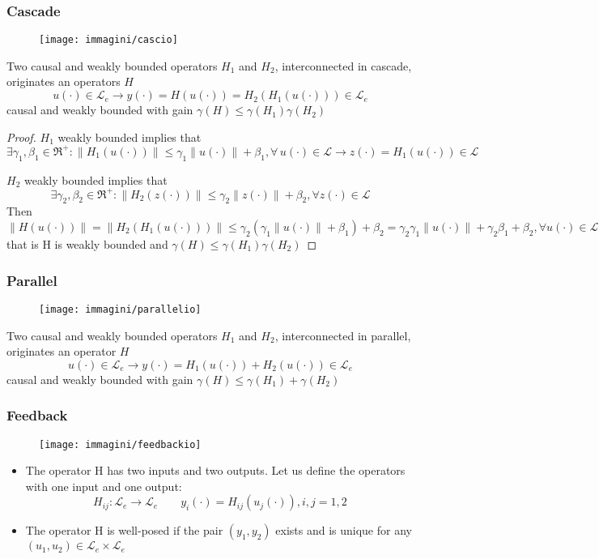 \subsubsection{Cascade}
\begin{figure}[H]
	\centering
	\texttt{[image: immagini/cascio]}
	\caption{}
	\label{fig:cascio}
\end{figure}
\begin{thm}
	Two causal and weakly bounded operators $H_1$ and $H_2$, interconnected in cascade, originates an operators $H$ 
	\[
	u(\cdot)\in\mathcal{L}_e\to y(\cdot)=H(u(\cdot))=H_2(H_1(u(\cdot)))\in\mathcal{L}_e
	\] 
	causal and weakly bounded with gain $\gamma(H)\le\gamma(H_1)\gamma(H_2)$
\end{thm}
\begin{proof}
	$H_1$ weakly bounded implies that
	\[\exists \gamma_1,\beta_1\in\Re^+:\|H_1(u(\cdot))\|\le\gamma_1\|u(\cdot)\|+\beta_1,\forall\, u(\cdot)\in\mathcal{L}\to z(\cdot)=H_1(u(\cdot))\in\mathcal{L}    \]
	
	$H_2$ weakly bounded implies that
	\[\exists \gamma_2,\beta_2\in\Re^+:\|H_2(z(\cdot))\|\le\gamma_2\|z(\cdot)\|+\beta_2,\forall z(\cdot)\in\mathcal{L}  \]
	Then
	\[
	\|H(u(\cdot))\|=\|H_2(H_1(u(\cdot)))\|\le\gamma_2(\gamma_1\|u(\cdot)\|+\beta_1)+\beta_2=\gamma_2\gamma_1\|u(\cdot)\|+\gamma_2\beta_1+\beta_2,\forall u(\cdot)\in\mathcal{L}
	\]
	that is H is weakly bounded and $\gamma(H)\le\gamma(H_1)\gamma(H_2)$
\end{proof}

\subsubsection{Parallel}
\begin{figure}[H]
	\centering
	\texttt{[image: immagini/parallelio]}
	\caption{}
	\label{fig:parallelio}
\end{figure}
\begin{thm}
	Two causal and weakly bounded operators $H_1$ and $H_2$, interconnected in parallel, originates an operator $H$  \[u(\cdot)\in\mathcal{L}_e\to y(\cdot)=H_1(u(\cdot))+H_2(u(\cdot))\in \mathcal{L}_e\] causal and weakly bounded with gain $\gamma(H)\le\gamma(H_1)+\gamma(H_2)$
\end{thm}
\subsubsection{Feedback}
\begin{figure}[H]
	\centering
	\texttt{[image: immagini/feedbackio]}
	\caption{}
	\label{fig:feedbackio}
\end{figure}
\begin{itemize}
	\item The operator H has two inputs and two outputs. Let us define the operators with one input and one output:
	\[
	H_{ij}:\mathcal{L}_e\to\mathcal{L}_e \qquad y_i(\cdot)=H_{ij}(u_j(\cdot)),i,j=1,2
	\]
	\item The operator H is well-posed if the pair $(y_1,y_2) $ exists and is unique for any $(u_1,u_2)\in \mathcal{L}_e\times\mathcal{L}_e$
\end{itemize}
